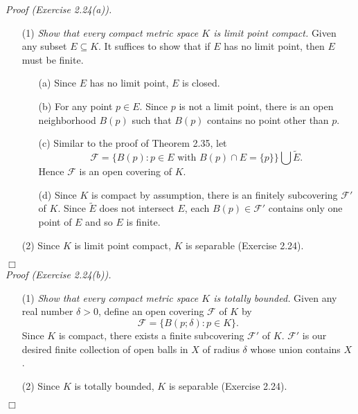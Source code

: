\documentclass{article}
\begin{document}
\emph{Proof (Exercise 2.24(a)).}
\begin{enumerate}
\item[(1)]
\emph{Show that every compact metric space $K$ is limit point compact.}
Given any subset $E \subseteq K$.
It suffices to show that if $E$ has no limit point, then $E$ must be finite.
  \begin{enumerate}
  \item[(a)]
  Since $E$ has no limit point, $E$ is closed.
  \item[(b)]
  For any point $p \in E$. Since $p$ is not a limit point,
  there is an open neighborhood $B(p)$ such that $B(p)$ contains no point other than $p$.
  \item[(c)]
  Similar to the proof of Theorem 2.35,
  let
  $$\mathscr{F} = \{ B(p) : p \in E \text{ with } B(p) \cap E = \{p\} \}
  \bigcup \widetilde{E}.$$
  Hence $\mathscr{F}$ is an open covering of $K$.
  \item[(d)]
  Since $K$ is compact by assumption,
  there is an finitely subcovering $\mathscr{F}'$ of $K$.
  Since $\widetilde{E}$ does not intersect $E$,
  each $B(p) \in \mathscr{F}'$
  contains only one point of $E$ and so $E$ is finite.
  \end{enumerate}
\item[(2)]
Since $K$ is limit point compact, $K$ is separable (Exercise 2.24).
\end{enumerate}
$\Box$ \\

\emph{Proof (Exercise 2.24(b)).}
\begin{enumerate}
\item[(1)]
\emph{Show that every compact metric space $K$ is totally bounded.}
Given any real number $\delta > 0$,
define an open covering $\mathscr{F}$ of $K$ by
$$\mathscr{F} = \{ B(p;\delta) : p \in K \}.$$
Since $K$ is compact,
there exists a finite subcovering $\mathscr{F}'$ of $K$.
$\mathscr{F}'$ is our desired finite collection of open balls in $X$
of radius $\delta$ whose union contains $X$.
\item[(2)]
Since $K$ is totally bounded, $K$ is separable (Exercise 2.24).
\end{enumerate}
$\Box$ \\
\end{document}
